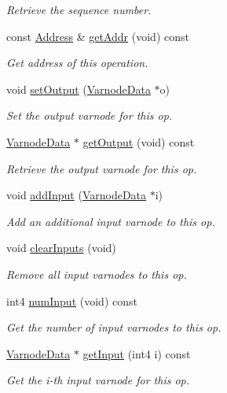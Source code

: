 \begin{DoxyCompactItemize}
\begin{DoxyCompactList}\small\item\em Retrieve the sequence number. \end{DoxyCompactList}\item 
const \mbox{\hyperlink{class_address}{Address}} \& \mbox{\hyperlink{class_pcode_op_raw_ad6fbe5fdf363a5f46361910de067cc96}{get\+Addr}} (void) const
\begin{DoxyCompactList}\small\item\em Get address of this operation. \end{DoxyCompactList}\item 
void \mbox{\hyperlink{class_pcode_op_raw_a1c25e2a933548b236169924aa3b40d46}{set\+Output}} (\mbox{\hyperlink{struct_varnode_data}{Varnode\+Data}} $\ast$o)
\begin{DoxyCompactList}\small\item\em Set the output varnode for this op. \end{DoxyCompactList}\item 
\mbox{\hyperlink{struct_varnode_data}{Varnode\+Data}} $\ast$ \mbox{\hyperlink{class_pcode_op_raw_a74d17c5335e043ff228c1c5f5e97cd74}{get\+Output}} (void) const
\begin{DoxyCompactList}\small\item\em Retrieve the output varnode for this op. \end{DoxyCompactList}\item 
void \mbox{\hyperlink{class_pcode_op_raw_acd56b621ed3037ffa2cd015ca77406c0}{add\+Input}} (\mbox{\hyperlink{struct_varnode_data}{Varnode\+Data}} $\ast$i)
\begin{DoxyCompactList}\small\item\em Add an additional input varnode to this op. \end{DoxyCompactList}\item 
void \mbox{\hyperlink{class_pcode_op_raw_ac9a26e03c83c2e057f90010d350be391}{clear\+Inputs}} (void)
\begin{DoxyCompactList}\small\item\em Remove all input varnodes to this op. \end{DoxyCompactList}\item 
int4 \mbox{\hyperlink{class_pcode_op_raw_a35819a340681743d4fb345b686ae5565}{num\+Input}} (void) const
\begin{DoxyCompactList}\small\item\em Get the number of input varnodes to this op. \end{DoxyCompactList}\item 
\mbox{\hyperlink{struct_varnode_data}{Varnode\+Data}} $\ast$ \mbox{\hyperlink{class_pcode_op_raw_a450f1af7453d285458b9cc00d5562bc4}{get\+Input}} (int4 i) const
\begin{DoxyCompactList}\small\item\em Get the i-\/th input varnode for this op. \end{DoxyCompactList}\end{DoxyCompactItemize}



